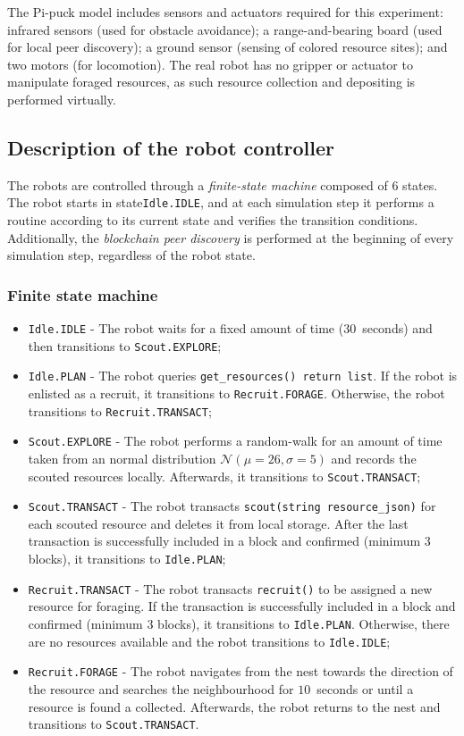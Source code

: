 \documentclass[runningheads]{llncs}
\newcommand{\rab}{range-and-bearing\xspace}
\begin{document}
The Pi-puck model includes sensors and actuators required for this experiment: infrared sensors (used for obstacle avoidance); a \rab board (used for local peer discovery); a ground sensor (sensing of colored resource sites); and two motors (for locomotion). The real robot has no gripper or actuator to manipulate foraged resources, as such resource collection and depositing is performed virtually.
 
\subsection{Description of the robot controller}
The robots are controlled through a \emph{finite-state machine} composed of 6 states. The robot starts in state\texttt{Idle.IDLE}, and at each simulation step it performs a routine according to its current state and verifies the transition conditions. Additionally, the \emph{blockchain peer discovery} is performed at the beginning of every simulation step, regardless of the robot state.

\subsubsection{Finite state machine}
\label{sec:finite-state-machine}
\begin{itemize}
\item \texttt{Idle.IDLE} - The robot waits for a fixed amount of time ($30$~seconds) and then transitions to \texttt{Scout.EXPLORE};
\item \texttt{Idle.PLAN} - The robot queries \texttt{get\_resources() return list}. If the robot is enlisted as a recruit, it transitions to \texttt{Recruit.FORAGE}. Otherwise, the robot transitions to \texttt{Recruit.TRANSACT};
\item \texttt{Scout.EXPLORE} - The robot performs a random-walk for an amount of time taken from an normal distribution $\mathcal{N}(\mu=26,\sigma=5)$ and records the scouted resources locally. Afterwards, it transitions to \texttt{Scout.TRANSACT};
\item \texttt{Scout.TRANSACT} - The robot transacts \texttt{scout(string resource\_json)} for each scouted resource and deletes it from local storage. After the last transaction is successfully included in a block and confirmed (minimum 3 blocks), it transitions to \texttt{Idle.PLAN};
\item \texttt{Recruit.TRANSACT} - The robot transacts \texttt{recruit()} to be assigned a new resource for foraging. If the transaction is successfully included in a block and confirmed (minimum 3 blocks), it transitions to \texttt{Idle.PLAN}. Otherwise, there are no resources available and the robot transitions to \texttt{Idle.IDLE};
\item \texttt{Recruit.FORAGE} - The robot navigates from the nest towards the direction of the resource and searches the neighbourhood for $10$~seconds or until a resource is found a collected. Afterwards, the robot returns to the nest and transitions to \texttt{Scout.TRANSACT}.
\end{itemize}
\end{document}
